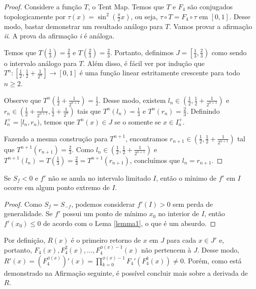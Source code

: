 \begin{proof}
Considere a função $T$, o Tent Map. Temos que $T$ e $F_4$ são conjugados topologicamente por $\tau(x) = \sin^2 \left( \frac{\pi}{2} x \right)$, ou seja, $\tau \circ T = F_4 \circ \tau$ em $[0, 1]$. Desse modo, bastar demonstrar um resultado análogo para $T$. Vamos provar a afirmação \textit{ii}. A prova da afirmação \textit{i} é análoga.

Temos que $T\left( \frac{1}{3} \right) = \frac{2}{3}$ e $T\left( \frac{2}{3} \right) = \frac{2}{3}$. Portanto, definimos $J = \left[ \frac{1}{3}, \frac{2}{3} \right)$ como sendo o intervalo análogo para $T$. Além disso, é fácil ver por indução que $T^n: \left[ \frac{1}{2}, \frac{1}{2} + \frac{1}{2^n} \right] \to [0, 1]$ é uma função linear estritamente crescente para todo $n \geq 2$.

Observe que $T^n\left( \frac{1}{2} + \frac{1}{2^{n+1}}\right) = \frac{1}{2}$. Desse modo, existem $l_n \in \left(\frac{1}{2}, \frac{1}{2} + \frac{1}{2^{n+1}}\right)$ e $r_n \in \left(\frac{1}{2} + \frac{1}{2^{n+1}}, \frac{1}{2} + \frac{1}{2^n} \right)$ tais que $T^n(l_n) = \frac{1}{3}$ e $T^n(r_n) = \frac{2}{3}$. Definindo $I^+_n = [l_n, r_n)$, temos que $T^n(x) \in J$ se o somente se $x \in I^+_n$.

Fazendo a mesma construção para $T^{n+1}$, encontramos $r_{n+1} \in \left(\frac{1}{2}, \frac{1}{2} + \frac{1}{2^{n+1}}\right)$ tal que $T^{n+1}(r_{n+1}) = \frac{2}{3}$. Como $l_n \in \left(\frac{1}{2}, \frac{1}{2} + \frac{1}{2^{n+1}}\right)$ e $T^{n+1}(l_n) = T\left(\frac{1}{3}\right) = \frac{2}{3} = T^{n+1}(r_{n+1})$, concluímos que $l_n = r_{n+1}$.
\end{proof}


\begin{affirmation}
Se $S_f < 0$ e $f'$ não se anula no intervalo limitado $I$, então o mínimo de $f'$ em $I$ ocorre em algum ponto extremo de $I$.
\end{affirmation}

\begin{proof}
Como $S_f = S_{-f}$, podemos considerar $f'(I) > 0$ sem perda de generalidade. Se $f'$ possui um ponto de mínimo $x_0$ no interior de $I$, então $f'(x_0) \leq 0$ de acordo com o Lema \ref{lemma1}, o que é um absurdo.
\end{proof}

Por definição, $R(x)$ é o primeiro retorno de $x$ em $J$ para cada $x \in J'$ e, portanto, $F_4^{}(x), F_4^{2}(x), \dots, F_4^{\phi(x) - 1}(x)$ não pertencem à $J$. Desse modo, $R'(x) = (F_4^{\phi(x)})'(x) = \prod_{k=0}^{\phi(x)-1}F_4'(F^{k}_4(x)) \neq 0$. Porém, como está demonstrado na Afirmação seguinte, é possível concluir mais sobre a derivada de $R$.

